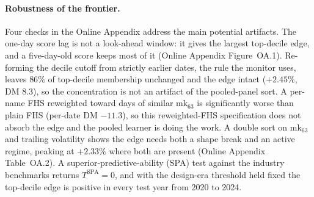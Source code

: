 \documentclass[11pt]{article}
\theoremstyle{remark}
\begin{document}
\paragraph{Robustness of the frontier.} Four checks in the Online Appendix address the main potential artifacts. The one-day score lag is not a
look-ahead window: it gives the largest top-decile edge, and a
five-day-old score keeps most of it (Online Appendix Figure~OA.1).
Re-forming the decile cutoff from strictly earlier dates, the rule the
monitor uses, leaves $86\%$ of top-decile membership unchanged and the
edge intact ($+2.45\%$, DM 8.3), so the concentration is not an artifact
of the pooled-panel sort. A per-name FHS reweighted toward days of
similar mk$_{63}$ is significantly worse than plain FHS (per-date DM
$-11.3$), so this reweighted-FHS specification does not absorb the edge and the
pooled learner is doing the work. A double sort on mk$_{63}$ and trailing
volatility shows the edge needs both a shape break and an active regime,
peaking at $+2.33\%$ where both are present (Online Appendix
Table~OA.2). A superior-predictive-ability (SPA) test \citep{hansen2005spa}
against the industry benchmarks returns $T^{\mathrm{SPA}}=0$, and with
the design-era threshold held fixed the top-decile edge is positive in
every test year from 2020 to 2024.
\end{document}
